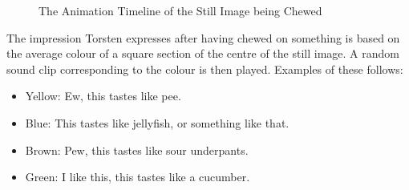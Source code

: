 \begin{center}
  \begin{figure}
    \noindent{}
    \caption{The Animation Timeline of the Still Image being Chewed}
    \label{ChewAni}
  \end{figure}
\end{center}

The impression Torsten expresses after having chewed on something is based on the average colour of a square section of the centre of the still image. A random sound clip corresponding to the colour is then played. Examples of these follows:
\begin{itemize}
  \item Yellow: Ew, this tastes like pee.
  \item Blue: This tastes like jellyfish, or something like that.
  \item Brown: Pew, this tastes like sour underpants.
  \item Green: I like this, this tastes like a cucumber.
\end{itemize}
